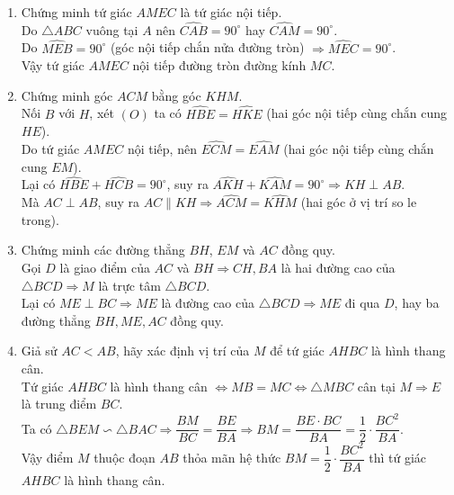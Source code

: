 \begin{ex}
{{{}}}	
     		\begin{enumerate}
                    \item 	Chứng minh tứ giác $AMEC$ là tứ giác nội tiếp.\\
                    Do $\triangle ABC$ vuông tại $A$ nên $\widehat{CAB}=90^\circ$ hay $\widehat{CAM}=90^\circ$.\\
                    Do $\widehat{MEB}=90^\circ$ (góc nội tiếp chắn nửa đường tròn) $\Rightarrow \widehat{MEC}=90^\circ$.\\
                    Vậy tứ giác $AMEC$ nội tiếp đường tròn đường kính $MC$.
                    \item 	Chứng minh góc $ACM$ bằng góc $KHM$.\\
                    Nối $B$ với $H$, xét $(O)$ ta có $\widehat{HBE}=\widehat{HKE}$ (hai góc nội tiếp cùng chắn cung $HE$).\\
                    Do tứ giác $AMEC$ nội tiếp, nên $\widehat{ECM}=\widehat{EAM}$ (hai góc nội tiếp cùng chắn cung $EM$).\\
                    Lại có $\widehat{HBE}+\widehat{HCB}=90^\circ$, suy ra $\widehat{AKH}+\widehat{KAM}=90^\circ \Rightarrow KH\perp AB$.\\
                    Mà $AC\perp AB$, suy ra $AC\parallel KH \Rightarrow \widehat{ACM}=\widehat{KHM}$ (hai góc ở vị trí so le trong).
                    \item	Chứng minh các đường thẳng $BH$, $EM$ và $AC$ đồng quy.\\
                    Gọi $D$ là giao điểm của $AC$ và $BH\Rightarrow CH, BA$ là hai đường cao của $\triangle BCD \Rightarrow M$ là trực tâm $\triangle BCD$.\\
                    Lại có $ME \perp BC\Rightarrow ME$ là đường cao của $\triangle BCD\Rightarrow ME$ đi qua $D$, hay ba đường thẳng $BH, ME, AC$ đồng quy.
                    \item 	Giả sử $AC<AB$, hãy xác định vị trí của $M$ để tứ giác $AHBC$ là hình thang cân.\\
                    Tứ giác $AHBC$ là hình thang cân $\Leftrightarrow MB=MC\Leftrightarrow \triangle MBC$ cân tại $M \Rightarrow E $ là trung điểm $BC$.\\
                    Ta có $\triangle BEM \backsim \triangle BAC \Rightarrow \dfrac{BM}{BC}=\dfrac{BE}{BA} \Rightarrow BM = \dfrac{BE\cdot BC}{BA}=\dfrac{1}{2}\cdot \dfrac{BC^2}{BA}$.\\
                    Vậy điểm $M$ thuộc đoạn $AB$ thỏa mãn hệ thức  $BM = \dfrac{1}{2}\cdot \dfrac{BC^2}{BA}$ thì  tứ giác $AHBC$ là hình thang cân.
\end{enumerate}
\end{ex}

